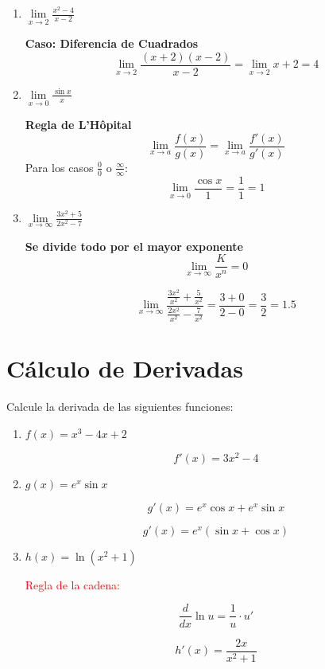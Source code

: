 \begin{enumerate}
    \item $ \lim\limits_{x \to 2} \frac{x^2 - 4}{x - 2} $
    
    \textbf{Caso: Diferencia de Cuadrados}
    \[ \lim\limits_{x \to 2} \frac{(x+2)(x-2)}{x-2} = \lim\limits_{x \to 2} x+2 = 4 \]
    
    \item $ \lim\limits_{x \to 0} \frac{\sin x}{x} $
    
    \textbf{Regla de L'Hôpital}
    \[ \lim\limits_{x \to a} \frac{f(x)}{g(x)} = \lim\limits_{x \to a} \frac{f'(x)}{g'(x)} \]
    Para los casos $ \frac{0}{0} $ o $ \frac{\infty}{\infty} $:
    \[ \lim\limits_{x \to 0} \frac{\cos x}{1} = \frac{1}{1} = 1 \]
    
    \item $ \lim\limits_{x \to \infty} \frac{3x^2 + 5}{2x^2 - 7} $
    
    \textbf{Se divide todo por el mayor exponente}
    \[ \lim\limits_{x \to \infty} \frac{K}{x^n} = 0 \]
    
    \[ \lim\limits_{x \to \infty} \frac{\frac{3x^2}{x^2} + \frac{5}{x^2}}{\frac{2x^2}{x^2} - \frac{7}{x^2}} = \frac{3 + 0}{2 - 0} = \frac{3}{2} = 1.5 \]
    
\end{enumerate}

\section*{Cálculo de Derivadas}

Calcule la derivada de las siguientes funciones:

\begin{enumerate}
    \item \( f(x) = x^3 - 4x + 2 \)
    
    \[
    f'(x) = 3x^2 - 4
    \]

    \item \( g(x) = e^x \sin x \)
    
    \[
    g'(x) = e^x \cos x + e^x \sin x
    \]
    
    \[
    g'(x) = e^x (\sin x + \cos x)
    \]

    \item \( h(x) = \ln(x^2 + 1) \)
    
    \textcolor{red}{Regla de la cadena:}
    
    \[
    \frac{d}{dx} \ln u = \frac{1}{u} \cdot u'
    \]
    
    \[
    h'(x) = \frac{2x}{x^2 + 1}
    \]
\end{enumerate}